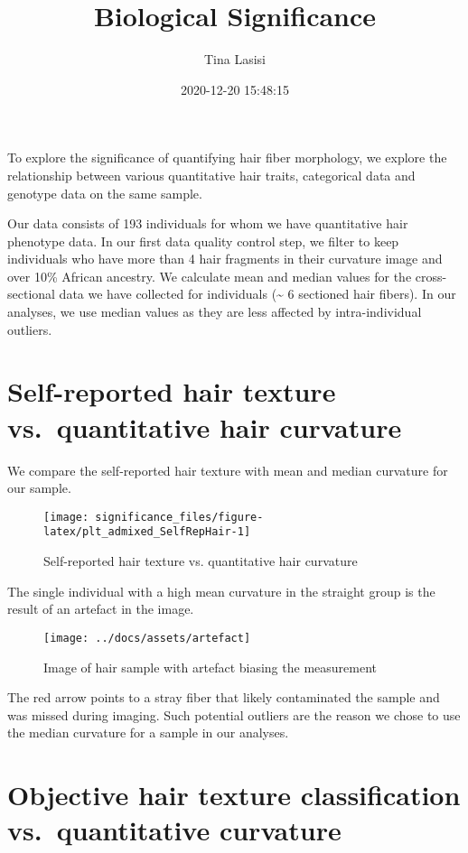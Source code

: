 \documentclass[
]{article}
\title{Biological Significance}
\author{Tina Lasisi}
\date{2020-12-20 15:48:15}
\begin{document}
\maketitle

To explore the significance of quantifying hair fiber morphology, we
explore the relationship between various quantitative hair traits,
categorical data and genotype data on the same sample.

Our data consists of 193 individuals for whom we have quantitative hair
phenotype data. In our first data quality control step, we filter to
keep individuals who have more than 4 hair fragments in their curvature
image and over 10\% African ancestry. We calculate mean and median
values for the cross-sectional data we have collected for individuals
(\textasciitilde{} 6 sectioned hair fibers). In our analyses, we use
median values as they are less affected by intra-individual outliers.

\hypertarget{self-reported-hair-texture-vs.-quantitative-hair-curvature}{%
\section{Self-reported hair texture vs.~quantitative hair
curvature}\label{self-reported-hair-texture-vs.-quantitative-hair-curvature}}

We compare the self-reported hair texture with mean and median curvature
for our sample.

\begin{figure}
\texttt{[image: significance\_files/figure-latex/plt\_admixed\_SelfRepHair-1]} \caption{Self-reported hair texture vs. quantitative hair curvature}\label{fig:plt_admixed_SelfRepHair}
\end{figure}

The single individual with a high mean curvature in the straight group
is the result of an artefact in the image.

\begin{figure}
\texttt{[image: ../docs/assets/artefact]} \caption{Image of hair sample with artefact biasing the measurement}\label{fig:artefact_im}
\end{figure}

The red arrow points to a stray fiber that likely contaminated the
sample and was missed during imaging. Such potential outliers are the
reason we chose to use the median curvature for a sample in our
analyses.

\hypertarget{objective-hair-texture-classification-vs.-quantitative-curvature}{%
\section{Objective hair texture classification vs.~quantitative
curvature}\label{objective-hair-texture-classification-vs.-quantitative-curvature}}
\end{document}
